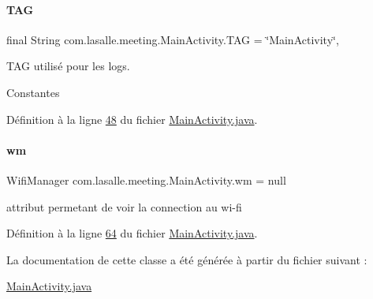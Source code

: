 \paragraph{\texorpdfstring{T\+AG}{TAG}}
{\footnotesize\ttfamily final String com.\+lasalle.\+meeting.\+Main\+Activity.\+T\+AG = \char`\"{}Main\+Activity\char`\"{}\hspace{0.3cm}{\ttfamily [static]}, {\ttfamily [private]}}



T\+AG utilisé pour les logs. 

Constantes 

Définition à la ligne \hyperlink{_main_activity_8java_source_l00048}{48} du fichier \hyperlink{_main_activity_8java_source}{Main\+Activity.\+java}.

\mbox{\label{classcom_1_1lasalle_1_1meeting_1_1_main_activity_ae7f6d13e941fdf4d6147df3a79e1aa22}} 
\paragraph{\texorpdfstring{wm}{wm}}
{\footnotesize\ttfamily Wifi\+Manager com.\+lasalle.\+meeting.\+Main\+Activity.\+wm = null\hspace{0.3cm}{\ttfamily [private]}}



attribut permetant de voir la connection au wi-\/fi 



Définition à la ligne \hyperlink{_main_activity_8java_source_l00064}{64} du fichier \hyperlink{_main_activity_8java_source}{Main\+Activity.\+java}.



La documentation de cette classe a été générée à partir du fichier suivant \+:\begin{DoxyCompactItemize}
\item 
\hyperlink{_main_activity_8java}{Main\+Activity.\+java}\end{DoxyCompactItemize}
